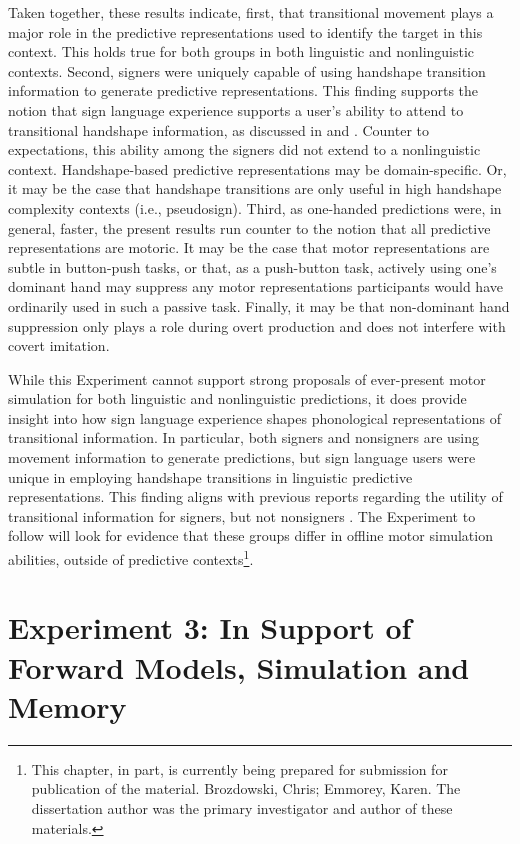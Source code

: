             Taken together, these results indicate, first, that transitional movement plays a major role in the predictive representations used to identify the target in this context. This holds true for both groups in both linguistic and nonlinguistic contexts. Second, signers were uniquely capable of using handshape transition information to generate predictive representations. This finding supports the notion that sign language experience supports a user’s ability to attend to transitional handshape information, as discussed in  and . Counter to expectations, this ability among the signers did not extend to a nonlinguistic context. Handshape-based predictive representations may be domain-specific. Or, it may be the case that handshape transitions are only useful in high handshape complexity contexts (i.e., pseudosign). Third, as one-handed predictions were, in general, faster, the present results run counter to the notion that all predictive representations are motoric. It may be the case that motor representations are subtle in button-push tasks, or that, as a push-button task, actively using one’s dominant hand may suppress any motor representations participants would have ordinarily used in such a passive task. Finally, it may be that non-dominant hand suppression only plays a role during overt production and does not interfere with covert imitation. \par
            While this Experiment cannot support strong proposals of ever-present motor simulation for both linguistic and nonlinguistic predictions, it does provide insight into how sign language experience shapes phonological representations of transitional information. In particular, both signers and nonsigners are using movement information to generate predictions, but sign language users were unique in employing handshape transitions in linguistic predictive representations. This finding aligns with previous reports regarding the utility of transitional information for signers, but not nonsigners \cite{geer2014}. The Experiment to follow will look for evidence that these groups differ in offline motor simulation abilities, outside of predictive contexts\footnote{This chapter, in part, is currently being prepared for submission for publication of the material. Brozdowski, Chris; Emmorey, Karen. The dissertation author was the primary investigator and author of these materials.}. 

\section{Experiment 3: In Support of Forward Models, Simulation and Memory}  
    \label{ch:supp} 
